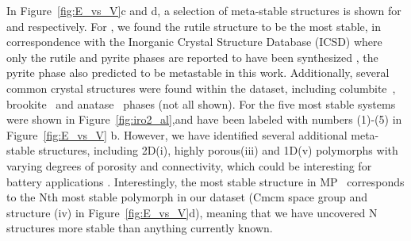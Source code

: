 In Figure~\ref{fig:E_vs_V}c and d, a selection of meta-stable structures is shown for \IrOtwo and \IrOthree respectively.
For \IrOtwo, we found the rutile structure to be the most stable, in correspondence with the Inorganic Crystal Structure Database (ICSD) where only the rutile and pyrite phases are reported to have been synthesized \cite{bolzan1997structural, shirako2014synthesis}, the pyrite phase also predicted to be metastable in this work. Additionally, several common \ABtwo crystal structures were found within the dataset, including columbite~\cite{columbite}, brookite~\cite{brookite} and anatase~\cite{anatase} phases (not all shown).
%
For \IrOthree the five most stable systems were shown in Figure~\ref{fig:iro2_al},and have been labeled with numbers (1)-(5) in Figure~\ref{fig:E_vs_V} b. However, we have identified several additional meta-stable structures, including 2D(i), highly porous(iii) and 1D(v) polymorphs with varying degrees of porosity and connectivity,
which could be interesting for battery applications \cite{}.
%
Interestingly, the most stable \IrOthree structure in MP~\cite{mp-1097041} corresponds to the Nth most stable \IrOthree polymorph in our dataset (Cmcm space group and structure (iv) in Figure~\ref{fig:E_vs_V}d), meaning that we have uncovered N \IrOthree structures more stable than anything currently known.


